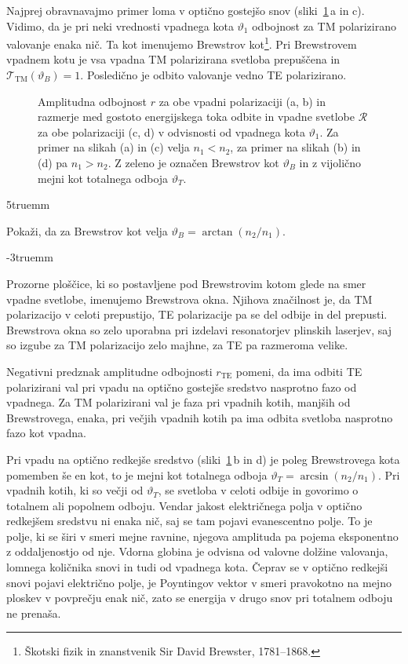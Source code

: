 Najprej obravnavajmo primer loma v optično gostejšo snov 
(sliki~\ref{fig:Brewster}\,a in c). Vidimo, da je pri neki vrednosti vpadnega kota $\vartheta_1$ odbojnost za 
TM polarizirano valovanje enaka nič. Ta kot imenujemo Brewstrov 
kot\footnote{Škotski fizik in znanstvenik Sir David Brewster, 1781--1868.}. 
Pri Brewstrovem vpadnem kotu je vsa vpadna TM polarizirana svetloba prepuščena
in $\mathcal{T}_\mathrm{TM}(\vartheta_B)=1$. Posledično je odbito valovanje vedno TE
polarizirano. 
\begin{figure}[h]
\centering
  \def\svgwidth{128truemm} 
  
\caption{Amplitudna odbojnost $r$ za obe vpadni polarizaciji (a, b) in razmerje med 
gostoto energijskega toka odbite in vpadne svetlobe $\mathcal{R}$ za obe polarizaciji (c, d)
v odvisnosti od vpadnega kota $\vartheta_1$. Za primer na slikah (a) in (c) velja $n_1<n_2$, za primer na 
slikah (b) in (d) pa $n_1>n_2$. Z zeleno je označen Brewstrov kot $\vartheta_B$ in
z vijolično mejni kot totalnega odboja $\vartheta_T$.}
\label{fig:Brewster}
\end{figure}
\vglue5truemm
\begin{naloga}
Pokaži, da za Brewstrov kot velja 
$\vartheta_{B}=\arctan\left(n_2/n_1\right).$
\label{eq:Brew}
\end{naloga}
\vglue-3truemm
\begin{remark}
Prozorne ploščice, ki so postavljene pod Brewstrovim kotom glede na smer vpadne svetlobe, 
imenujemo Brewstrova okna. Njihova značilnost je,
da TM polarizacijo v celoti prepustijo, TE polarizacije pa se del odbije in  
del prepusti. Brewstrova okna so zelo uporabna pri izdelavi resonatorjev 
plinskih laserjev, saj so izgube za TM polarizacijo zelo majhne, 
za TE pa razmeroma velike.  
\end{remark}

Negativni predznak amplitudne odbojnosti $r_{\mathrm{TE}}$ pomeni, da ima odbiti TE 
polarizirani val pri vpadu na optično gostejše sredstvo nasprotno 
fazo od vpadnega. Za TM polarizirani val je faza pri vpadnih kotih, manjših od Brewstrovega, 
enaka, pri večjih vpadnih kotih pa ima odbita svetloba nasprotno fazo kot vpadna. 

Pri vpadu na optično redkejše sredstvo (sliki~\ref{fig:Brewster}\,b in d) je poleg Brewstrovega kota
pomemben še en kot, to je mejni kot totalnega odboja $\vartheta_T = \arcsin\left(n_2/n_1\right)$. 
Pri vpadnih kotih, ki so večji od $\vartheta_T$, se svetloba v celoti odbije in govorimo
o totalnem ali popolnem odboju. 
Vendar jakost električnega polja v optično redkejšem sredstvu
ni enaka nič, saj se tam pojavi evanescentno polje.
To je polje, ki se širi v smeri mejne ravnine, njegova amplituda pa pojema 
eksponentno z oddaljenostjo od nje. Vdorna globina je odvisna od valovne 
dolžine valovanja, lomnega količnika snovi in tudi od vpadnega kota. 
Čeprav se v optično redkejši snovi pojavi električno polje, je Poyntingov
vektor v smeri pravokotno na mejno ploskev v povprečju enak nič, zato se energija
v drugo snov pri totalnem odboju ne prenaša.

